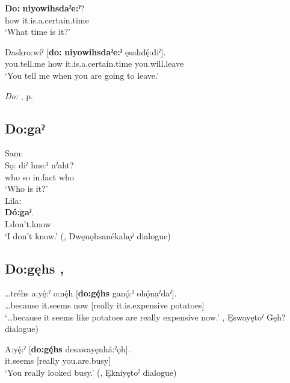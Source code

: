 \ea
\label{ex:dpart31}
\gll \textbf{Do:} \textbf{niyowihsdaˀe:ˀ}?\\
how it.is.a.certain.time\\
\glt ‘What time is it?’
\z

\ea
\label{ex:dpart32}
\gll Daskro:wíˀ [\textbf{do:} \textbf{niyowihsdaˀe:ˀ} ęsahdę́:diˀ]. \\
you.tell.me how it.is.a.certain.time you.will.leave\\
\glt ‘You tell me when you are going to leave.’
\z

\begin{CayugaRelated}
\item \textit{Do:} , p. \pageref{p:[do:]}
\end{CayugaRelated}

\subsection*{\textbf{Do:gaˀ} } \label{p:[do:gaˀ]}

\ea
\label{ex:dpart58}
Sam:\\
\gll Sǫ: diˀ hne:ˀ nˀaht? \\
who so in.fact who \\
\glt `Who is it?’ \\
Lila: \\
\gll \textbf{Dó:gaˀ}. \\
I.don’t.know \\
\glt ‘I don’t know.’ (\cite[441]{mithun_watewayestanih_1984}, Dwęnǫhsanékahǫˀ dialogue)
\z


\subsection*{\textbf{Do:gęhs} , } \label{p:[do:gęhs]}

\ea
\label{ex:dpart59}
\gll …tréhs a:yę́:ˀ o:nę́h [\textbf{do:gę́hs} ganǫ́:ˀ ohǫ́na̱ˀdaˀ].\\
…because it.seems now [really it.is.expensive potatoes] \\
\glt ‘…because it seems like potatoes are really expensive now.’ \cite[420]{mithun_watewayestanih_1984}, Ęswayętoˀ Gęh? dialogue)
\z

\ea
\label{ex:dpart60}
\gll A:yę́:ˀ [\textbf{do:gę́hs} desawayęnhá:ˀǫh]. \\
it.seems [really you.are.busy] \\
\glt ‘You really looked busy.’ (\cite[494]{mithun_watewayestanih_1984}, Ękníyętoˀ dialogue)
\z

